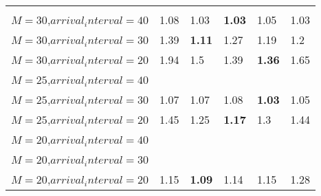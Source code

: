 \begin{tabular}{l  | l l l l l }
& \multicolumn{5}{c}{} \\
$M=30$,$arrival_interval=40$ & 1.08 & 1.03 & \textbf{1.03} & 1.05 & 1.03 \\
$M=30$,$arrival_interval=30$ & 1.39 & \textbf{1.11} & 1.27 & 1.19 & 1.2 \\
$M=30$,$arrival_interval=20$ & 1.94 & 1.5 & 1.39 & \textbf{1.36} & 1.65 \\
$M=25$,$arrival_interval=40$ &  &  &  &  &  \\
$M=25$,$arrival_interval=30$ & 1.07 & 1.07 & 1.08 & \textbf{1.03} & 1.05 \\
$M=25$,$arrival_interval=20$ & 1.45 & 1.25 & \textbf{1.17} & 1.3 & 1.44 \\
$M=20$,$arrival_interval=40$ &  &  &  &  &  \\
$M=20$,$arrival_interval=30$ &  &  &  &  &  \\
$M=20$,$arrival_interval=20$ & 1.15 & \textbf{1.09} & 1.14 & 1.15 & 1.28
\end{tabular}